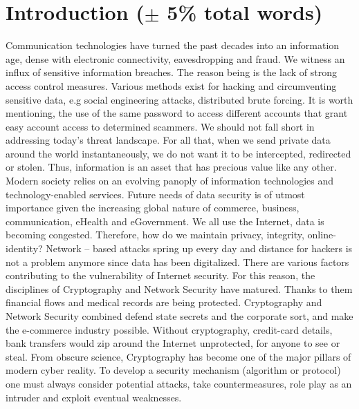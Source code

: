 \section{Introduction ($\pm$ 5\% total words)}
Communication technologies have turned the past decades into an information age, dense with electronic connectivity, eavesdropping and fraud. We witness an influx of sensitive information breaches. The reason being is the lack of strong access control measures. Various methods exist for hacking and circumventing sensitive data, e.g social engineering attacks, distributed brute forcing. It is worth mentioning, the use of the same password to access different accounts that grant easy account access to determined scammers. We should not fall short in addressing today’s threat landscape. For all that, when we send private data around the world instantaneously, we do not want it to be intercepted, redirected or stolen. Thus, information is an asset that has precious value like any other. Modern society relies on an evolving panoply of information technologies and technology-enabled services. Future needs of data security is of utmost importance given the increasing global nature of commerce, business, communication, eHealth and eGovernment. We all use the Internet, data is becoming congested. Therefore, how do we maintain privacy, integrity, online-identity? Network – based attacks spring up every day and distance for hackers is not a problem anymore since data has been digitalized. There are various factors contributing to the vulnerability of Internet security. For this reason, the disciplines of Cryptography and Network Security have matured. Thanks to them financial flows and medical records are being protected. Cryptography and Network Security combined defend state secrets and the corporate sort, and make the e-commerce industry possible. Without cryptography, credit-card details, bank transfers would zip around the Internet unprotected, for anyone to see or steal. From obscure science, Cryptography has become one of the major pillars of modern cyber reality. To develop a security mechanism (algorithm or protocol) one must always consider potential attacks, take countermeasures, role play as an intruder and exploit eventual weaknesses.

